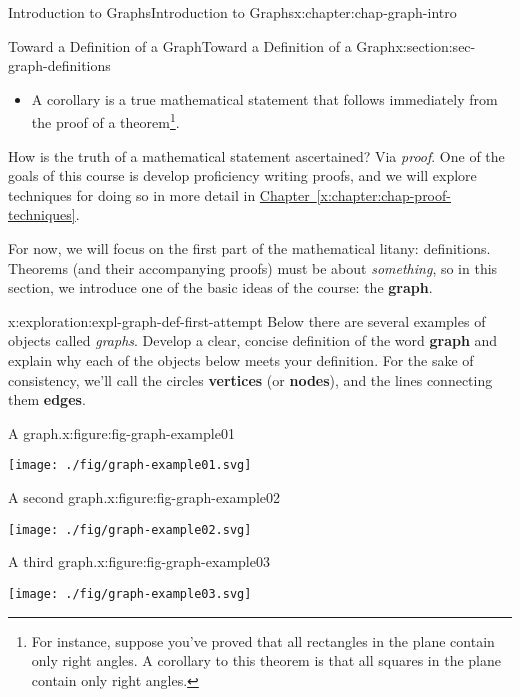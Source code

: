 \documentclass[oneside,10pt,]{book}
\newcommand{\xreffont}{\relax}
\newcommand{\terminology}[1]{\textbf{#1}}
\begin{document}
\begin{chapterptx}{Introduction to Graphs}{}{Introduction to Graphs}{}{}{x:chapter:chap-graph-intro}
\begin{sectionptx}{Toward a Definition of a Graph}{}{Toward a Definition of a Graph}{}{}{x:section:sec-graph-definitions}
\begin{introduction}{}
\begin{itemize}[label=\textbullet]
\item{}A corollary is a true mathematical statement that follows immediately from the proof of a theorem\footnote{For instance, suppose you've proved that all rectangles in the plane contain only right angles. A corollary to this theorem is that all squares in the plane contain only right angles.\label{g:fn:idp105545028203408}}.%
\end{itemize}
%
\par
How is the truth of a mathematical statement ascertained? Via \emph{proof}. One of the goals of this course is develop proficiency writing proofs, and we will explore techniques for doing so in more detail in \hyperref[x:chapter:chap-proof-techniques]{Chapter~{\xreffont\ref{x:chapter:chap-proof-techniques}}}.%
\par
For now, we will focus on the first part of the mathematical litany: definitions. Theorems (and their accompanying proofs) must be about \emph{something}, so in this section, we introduce one of the basic ideas of the course: the \terminology{graph}.%
\end{introduction}%
\begin{exploration}{}{x:exploration:expl-graph-def-first-attempt}%
Below there are several examples of objects called \emph{graphs}. Develop a clear, concise definition of the word \terminology{graph} and explain why each of the objects below meets your definition. For the sake of consistency, we'll call the circles \terminology{vertices} (or \terminology{nodes}), and the lines connecting them \terminology{edges}.%
\begin{figureptx}{A graph.}{x:figure:fig-graph-example01}{}%
\begin{image}{0.375}{0.25}{0.375}%
\texttt{[image: ./fig/graph-example01.svg]}
\end{image}%
\tcblower
\end{figureptx}%
\begin{figureptx}{A second graph.}{x:figure:fig-graph-example02}{}%
\begin{image}{0.375}{0.25}{0.375}%
\texttt{[image: ./fig/graph-example02.svg]}
\end{image}%
\tcblower
\end{figureptx}%
\begin{figureptx}{A third graph.}{x:figure:fig-graph-example03}{}%
\begin{image}{0.375}{0.25}{0.375}%
\texttt{[image: ./fig/graph-example03.svg]}
\end{image}%

\end{figureptx}
\end{exploration}
\end{sectionptx}
\end{chapterptx}
\end{document}
